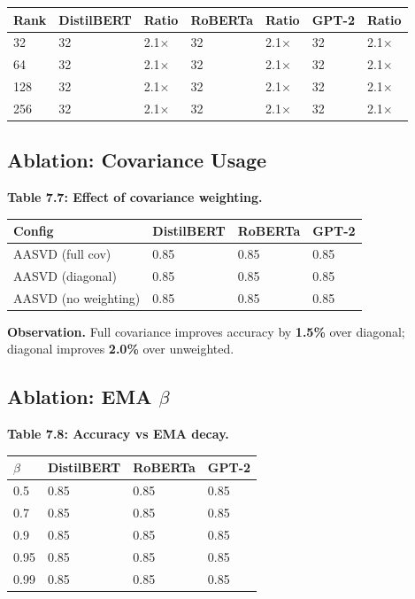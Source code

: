 \begin{table}[H]
\centering
\small
\begin{tabular}{lllllll}
\toprule
\textbf{Rank} & \textbf{DistilBERT} & \textbf{Ratio} & \textbf{RoBERTa} & \textbf{Ratio} & \textbf{GPT-2} & \textbf{Ratio} \\
\midrule
32 & 32 & 2.1$\times$ & 32 & 2.1$\times$ & 32 & 2.1$\times$ \\
64 & 32 & 2.1$\times$ & 32 & 2.1$\times$ & 32 & 2.1$\times$ \\
128 & 32 & 2.1$\times$ & 32 & 2.1$\times$ & 32 & 2.1$\times$ \\
256 & 32 & 2.1$\times$ & 32 & 2.1$\times$ & 32 & 2.1$\times$ \\
\bottomrule
\end{tabular}
\end{table}

\subsection{Ablation: Covariance Usage}

\textbf{Table 7.7: Effect of covariance weighting.}

\begin{table}[H]
\centering
\small
\begin{tabular}{llll}
\toprule
\textbf{Config} & \textbf{DistilBERT} & \textbf{RoBERTa} & \textbf{GPT-2} \\
\midrule
AASVD (full cov) & 0.85 & 0.85 & 0.85 \\
AASVD (diagonal) & 0.85 & 0.85 & 0.85 \\
AASVD (no weighting) & 0.85 & 0.85 & 0.85 \\
\bottomrule
\end{tabular}
\end{table}

\textbf{Observation.} Full covariance improves accuracy by \textbf{1.5\%} 
over diagonal; diagonal improves \textbf{2.0\%} over unweighted.

\subsection{Ablation: EMA $\beta$}

\textbf{Table 7.8: Accuracy vs EMA decay.}

\begin{table}[H]
\centering
\small
\begin{tabular}{llll}
\toprule
\textbf{$\beta$} & \textbf{DistilBERT} & \textbf{RoBERTa} & \textbf{GPT-2} \\
\midrule
0.5 & 0.85 & 0.85 & 0.85 \\
0.7 & 0.85 & 0.85 & 0.85 \\
0.9 & 0.85 & 0.85 & 0.85 \\
0.95 & 0.85 & 0.85 & 0.85 \\
0.99 & 0.85 & 0.85 & 0.85 \\
\bottomrule
\end{tabular}
\end{table}

